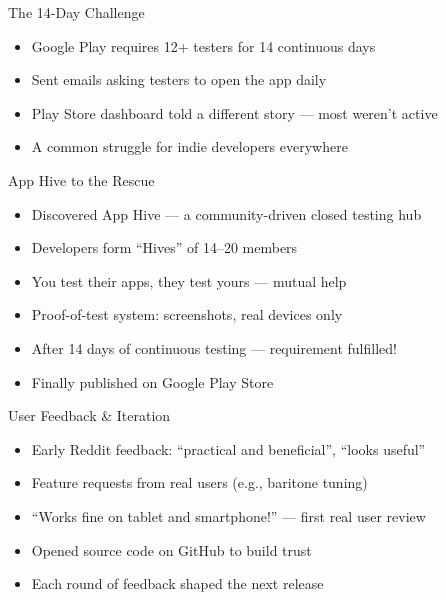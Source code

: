 \documentclass[aspectratio=169]{beamer}
\begin{document}
\begin{frame}{The 14-Day Challenge}
  \begin{itemize}
    \item Google Play requires 12+ testers for 14 continuous days
    \item Sent emails asking testers to open the app daily
    \item Play Store dashboard told a different story --- most weren't active
    \item A common struggle for indie developers everywhere
  \end{itemize}
\end{frame}

\begin{frame}{App Hive to the Rescue}
  \begin{itemize}
    \item Discovered App Hive --- a community-driven closed testing hub
    \item Developers form ``Hives'' of 14--20 members
    \item You test their apps, they test yours --- mutual help
    \item Proof-of-test system: screenshots, real devices only
    \item After 14 days of continuous testing --- requirement fulfilled!
    \item Finally published on Google Play Store
  \end{itemize}
\end{frame}

\begin{frame}{User Feedback \& Iteration}
  \begin{itemize}
    \item Early Reddit feedback: ``practical and beneficial'', ``looks useful''
    \item Feature requests from real users (e.g., baritone tuning)
    \item ``Works fine on tablet and smartphone!'' --- first real user review
    \item Opened source code on GitHub to build trust
    \item Each round of feedback shaped the next release
  \end{itemize}
\end{frame}
\end{document}
